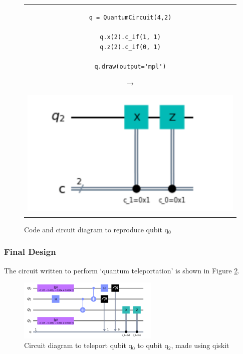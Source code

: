 \begin{figure}[H]
\centering
\begin{tabular}{c}
\begin{minipage}[c]{.45\linewidth}
\begin{verbatim}
q = QuantumCircuit(4,2)

q.x(2).c_if(1, 1)
q.z(2).c_if(0, 1)

q.draw(output='mpl')
\end{verbatim}
\end{minipage}
\begin{minipage}[c]{.1\linewidth}
\centering
$\rightarrow$
\end{minipage}
\begin{minipage}[c]{.4\linewidth}
\centering
\includegraphics[width=\textwidth]{lab3/images/Step4.png}
\end{minipage}\\
\\ 
\end{tabular}
\caption{Code and circuit diagram to reproduce qubit q$_0$}
\label{step4}
\end{figure}

\subsubsection{Final Design}
The circuit written to perform `quantum teleportation' is shown in Figure \ref{fig:teleportCircuit}.
\begin{figure}[H]
    \centering
    \includegraphics[width=0.6\textwidth]{lab3/images/teleportCircuit.png}
    \caption{Circuit diagram to teleport qubit q$_0$ to qubit q$_2$, made using qiskit}
    \label{fig:teleportCircuit}
\end{figure}

